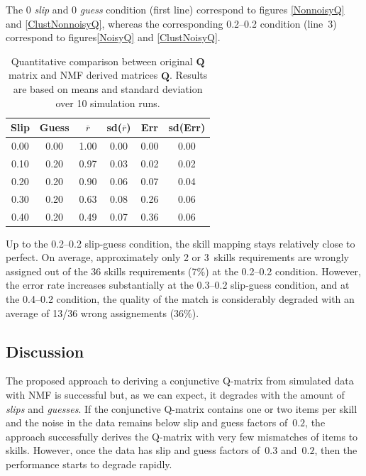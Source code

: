 The 0 \textit{slip} and 0 \textit{guess} condition (first line) correspond to figures \ref{NonnoisyQ} and \ref{ClustNonnoisyQ}, whereas the corresponding 0.2--0.2 condition (line~3) correspond to figures\ref{NoisyQ}  and \ref{ClustNoisyQ}.



\newcommand{\ha}[2]{\multicolumn{#1}{c}{\textbf{#2}}}
\newcommand{\hb}[1]{\ha{1}{#1}}
\begin{table}
  \caption{Quantitative comparison between original $\mathbf{Q}$ matrix and NMF derived matrices $\hat{\mathbf{Q}}$.  Results are based on means and standard deviation over 10 simulation runs.}
  \begin{center}
  \begin{tabular}{cccccc}
    \hline
 \hb{Slip} & \hb{Guess} & \hb{$\overline{r}$} & \hb{sd($\overline{r}$)} & \hb{Err} & \hb{sd(Err)} \\ 
  \hline
0.00 & 0.00 & 1.00 & 0.00 & 0.00 & 0.00 \\ 
0.10 & 0.20 & 0.97 & 0.03 & 0.02 & 0.02 \\ 
0.20 & 0.20 & 0.90 & 0.06 & 0.07 & 0.04 \\ 
0.30 & 0.20 & 0.63 & 0.08 & 0.26 & 0.06 \\ 
0.40 & 0.20 & 0.49 & 0.07 & 0.36 & 0.06 \\ 
  \hline
  \end{tabular}
  \end{center}

\label{tab:wq-comp}
\end{table}

Up to the 0.2--0.2 slip-guess condition, the skill mapping stays relatively close to perfect. On average, approximately only 2 or 3~skills requirements are wrongly assigned out of the 36 skills requirements (7\%) at the 0.2--0.2 condition.  However, the error rate increases substantially at the 0.3--0.2 slip-guess condition, and at the 0.4--0.2 condition, the quality of the match is considerably degraded with an average of 13/36 wrong assignements (36\%).

\subsection{Discussion}

The proposed approach to deriving a conjunctive Q-matrix from simulated data with NMF is successful but, as we can expect, it degrades with the amount of \textit{slips} and \textit{guesses}. If the conjunctive Q-matrix contains one or two items per skill and the noise in the data remains below slip and guess factors of~$0.2$, the approach successfully derives the Q-matrix with very few mismatches of items to skills.  However, once the data has slip and guess factors of~$0.3$ and~$0.2$, then the performance starts to degrade rapidly.

